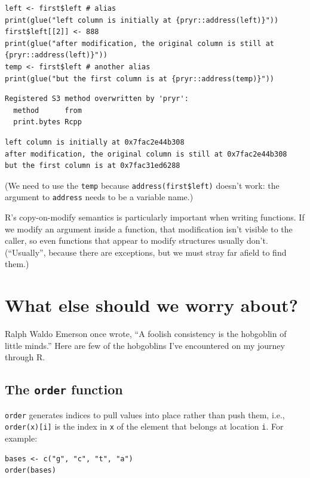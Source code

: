 \begin{lstlisting}
left <- first$left # alias
print(glue("left column is initially at {pryr::address(left)}"))
first$left[[2]] <- 888
print(glue("after modification, the original column is still at {pryr::address(left)}"))
temp <- first$left # another alias
print(glue("but the first column is at {pryr::address(temp)}"))
\end{lstlisting}

\begin{lstlisting}
Registered S3 method overwritten by 'pryr':
  method      from
  print.bytes Rcpp
\end{lstlisting}

\begin{lstlisting}
left column is initially at 0x7fac2e44b308
after modification, the original column is still at 0x7fac2e44b308
but the first column is at 0x7fac31ed6288
\end{lstlisting}

\noindent
(We need to use the  \texttt{temp}
because \texttt{address(first\$left)} doesn't work:
the argument to \texttt{address} needs to be a variable name.)

R's copy-on-modify semantics is particularly important when writing functions.
If we modify an argument inside a function,
that modification isn't visible to the caller,
so even functions that appear to modify structures usually don't.
(``Usually'', because there are exceptions, but we must stray far afield to find them.)

\section{What else should we worry about?}

Ralph Waldo Emerson once wrote, ``A foolish consistency is the hobgoblin of little minds.''
Here are few of the hobgoblins I've encountered on my journey through R.

\subsection*{The \texttt{order} function}

\texttt{order} generates indices to pull values into place rather than push them,
i.e.,
\texttt{order(x)[i]} is the index in \texttt{x} of the element that belongs at location \texttt{i}.
For example:

\begin{lstlisting}
bases <- c("g", "c", "t", "a")
order(bases)
\end{lstlisting}

